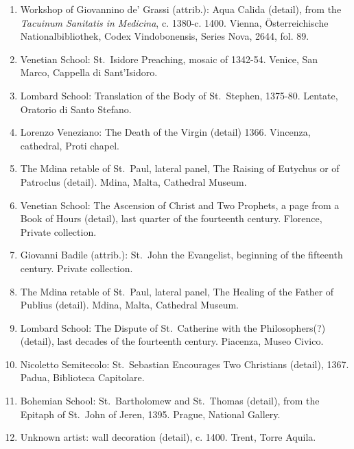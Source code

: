 \documentclass[a4paper,12pt]{article}
\begin{document}
\begin{enumerate}
\item %
Workshop of Giovannino de' Grassi (attrib.): Aqua Calida (detail),
from the \textit{Tacuinum Sanitatis in Medicina}, c. 1380-c. 1400.
Vienna, \"Osterreichische Nationalbibliothek, Codex Vindobonensis,
Series Nova, 2644, fol. 89.

\item %
Venetian School: St.~Isidore Preaching, mosaic of 1342-54.
Venice, San Marco, Cappella di Sant'Isidoro.

\item %
Lombard School: Translation of the Body of St.~Stephen, 1375-80.
Lentate, Oratorio di Santo Stefano.

\item %
Lorenzo Veneziano: The Death of the Virgin (detail) 1366. Vincenza,
cathedral, Proti chapel.

\item %
The Mdina retable of St.~Paul, lateral panel, The Raising of Eutychus
or of Patroclus (detail).  Mdina, Malta, Cathedral Museum.

\item %
Venetian School: The Ascension of Christ and Two Prophets, a page from
a Book of Hours (detail), last quarter of the fourteenth century.
Florence, Private collection.

\item %
Giovanni Badile (attrib.): St.~John the Evangelist, beginning of the
fifteenth century.  Private collection.

\item %
The Mdina retable of St.~Paul, lateral panel, The Healing of the
Father of Publius (detail).  Mdina, Malta, Cathedral Museum.

\item %
Lombard School: The Dispute of St.~Catherine with the Philosophers(?)
(detail), last decades of the fourteenth century.  Piacenza, Museo
Civico.

\item %
Nicoletto Semitecolo: St.~Sebastian Encourages Two Christians
(detail), 1367.  Padua, Biblioteca Capitolare.

\item %
Bohemian School: St.~Bartholomew and St.~Thomas (detail), from the
Epitaph of St.~John of Jeren, 1395.  Prague, National Gallery.

\item %
Unknown artist: wall decoration (detail), c. 1400.  Trent, Torre
Aquila.


\end{enumerate}
\end{document}
